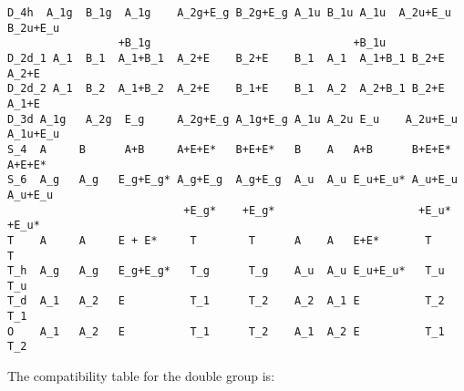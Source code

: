 \documentclass[12pt,a4paper]{article}
\begin{document}
\begin{footnotesize}
\begin{verbatim}
D_4h  A_1g  B_1g  A_1g    A_2g+E_g B_2g+E_g A_1u B_1u A_1u  A_2u+E_u B_2u+E_u
                 +B_1g                               +B_1u 
D_2d_1 A_1  B_1  A_1+B_1  A_2+E    B_2+E    B_1  A_1  A_1+B_1 B_2+E   A_2+E
D_2d_2 A_1  B_2  A_1+B_2  A_2+E    B_1+E    B_1  A_2  A_2+B_1 B_2+E   A_1+E
D_3d A_1g   A_2g  E_g     A_2g+E_g A_1g+E_g A_1u A_2u E_u    A_2u+E_u A_1u+E_u 
S_4  A     B      A+B     A+E+E*   B+E+E*   B    A   A+B      B+E+E*   A+E+E* 
S_6  A_g   A_g   E_g+E_g* A_g+E_g  A_g+E_g  A_u  A_u E_u+E_u* A_u+E_u A_u+E_u
                           +E_g*    +E_g*                      +E_u*   +E_u*
T    A     A     E + E*     T        T      A    A   E+E*       T        T
T_h  A_g   A_g   E_g+E_g*   T_g      T_g    A_u  A_u E_u+E_u*   T_u      T_u
T_d  A_1   A_2   E          T_1      T_2    A_2  A_1 E          T_2      T_1
O    A_1   A_2   E          T_1      T_2    A_1  A_2 E          T_1      T_2
\end{verbatim}
\end{footnotesize}
The compatibility table for the double group is:
\end{document}
